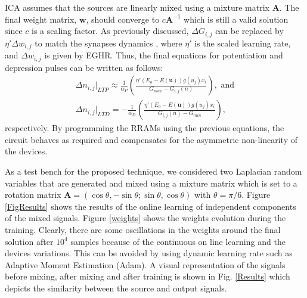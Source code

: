 \documentclass[english]{article}
\renewcommand{\cite}{\citep}
\begin{document}
ICA assumes that the sources are linearly mixed using a mixture matrix $\mathbf{A}$. The final weight matrix, $\mathbf{w}$, should converge to $c \mathbf{A}^{-1}$ which is still a valid solution since $c$ is a scaling factor. 
As previously discussed, $\Delta G_{i,j}$ can be replaced by $\eta' \Delta w_{i,j}$ to match the synapses dynamics \cite{Fouda_etal18_indecomp}, where $\eta'$ is the scaled learning rate, and $\Delta w_{i,j}$ is given by EGHR. Thus, the final equations for potentiation and depression pulses can be written as follows: 
\begin{eqnarray}
\Delta n_{i,j}|_{LTP}\approx \frac{1}{\alpha_P}\left(\frac{\eta' (E_o-E(\mathbf{u}))g(u_j)x_i}{G_{max}-G_{i,j}(n)}\right),\,\, \text{and} \\
\Delta n_{i,j}|_{LTD}=-\frac{1}{\alpha_D}\left(\frac{\eta' (E_o-E(\mathbf{u}))g(u_j)x_i}{G_{i,j}(n)-G_{min}}\right), 
\end{eqnarray}
\noindent respectively. By programming the RRAMs using the previous equations, the circuit behaves as required and compensates for the asymmetric non-linearity of the devices.

As a test bench for the proposed technique, we considered two Laplacian random variables that are generated and mixed using a mixture matrix which is set to a rotation matrix $\mathbf{A}=(\cos\theta, -\sin\theta; \sin\theta, \cos\theta)$ with $\theta=\pi/6$. Figure \ref{FigResults} shows the results of the online learning of independent components of the mixed signals. 
Figure \ref{weights} shows the weights evolution during the training. Clearly, there are some oscillations in the weights around the final solution after $10^4$ samples because of the continuous on line learning and the devices variations. This can be avoided by using dynamic learning rate such as Adaptive Moment Estimation (Adam). A visual representation of the signals before mixing, after mixing and after training is shown in Fig. \ref{Results} which depicts the similarity between the source and output signals.
\end{document}
